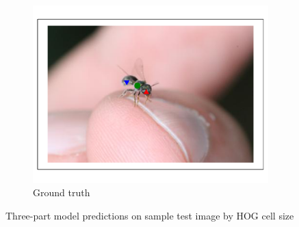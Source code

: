 \documentclass[11pt, oneside]{report}
\begin{document}
\begin{figure}[p]
\begin{subfigure}[b]{0.3\textwidth}
                \includegraphics[width=\textwidth]{hog_gt2.pdf}
                \caption{Ground truth}
            \end{subfigure}

            \hspace{0pt}

            \begin{subfigure}[b]{0.2\textwidth}
                \centering
            \end{subfigure}
            \caption{Three-part model predictions on sample test image by HOG cell size}
            \label{fig:hog_vis1}
        \end{figure}
\end{document}
